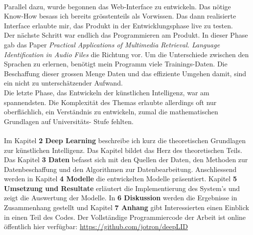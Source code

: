 \\
Parallel dazu, wurde begonnen das Web-Interface zu entwickeln. Das nötige Know-How besass ich bereits grösstenteils als Vorwissen. Das dann realisierte Interface erlaubte mir, das Produkt in der Entwicklungsphase live zu testen. 
\\
Der nächste Schritt war endlich das Programmieren am Produkt. In dieser Phase gab das Paper \textit{Practical Applications of Multimedia Retrieval. Language Identification in Audio
Files}\parencite{iLID} die Richtung vor. 
Um die Unterschiede zwischen den Sprachen zu erlernen, benötigt mein Programm viele Trainings-Daten. Die Beschaffung dieser grossen Menge Daten und das effiziente Umgehen damit, sind ein nicht zu unterschätzender Aufwand. 
\\
Die letzte Phase, das Entwickeln der künstlichen Intelligenz, war am spannendsten. Die Komplexität des Themas erlaubte allerdings oft nur oberflächlich, ein Verständnis zu entwickeln, zumal die mathematischen Grundlagen auf Universitäts- Stufe fehlten. 
\\ \\
Im Kapitel \textbf{2 Deep Learning} beschreibe ich kurz die theoretischen Grundlagen zur künstlichen Intelligenz. Das Kapitel bildet das Herz des theoretischen Teils. Das Kapitel \textbf{3
Daten} befasst sich mit den Quellen der Daten, den Methoden zur Datenbeschaffung und den Algorithmen zur Datenbearbeitung. Anschliessend werden in Kapitel \textbf{4 Modelle} die entwickelten Modelle präsentiert. Kapitel \textbf{5 Umsetzung und Resultate} erläutert die Implementierung des System's und zeigt die Auswertung der Modelle. In \textbf{6 Diskussion} werden die
Ergebnisse in Zusammenhang gestellt und Kapitel \textbf{7 Anhang} gibt Interessierten einen Einblick in einen Teil des Codes. Der Vollständige Programmiercode der Arbeit ist online öffentlich hier verfügbar: \url{https://github.com/jotron/deepLID}
